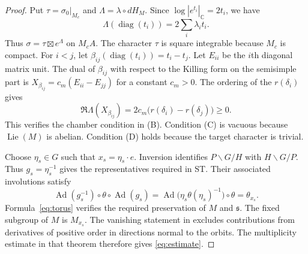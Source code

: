 \documentclass[11pt]{amsart}
\newcommand{\C}{\mathbb C}
\DeclareMathOperator{\Ad}{Ad}
\DeclareMathOperator{\diag}{diag}
\DeclareMathOperator{\Lie}{Lie}
\numberwithin{equation}{section}
\begin{document}
\begin{proof}
Put $\tau=\sigma_0|_{M_c}$ and $\Lambda=\lambda\circ dH_M$.
Since $\log|e^{t_i}|_\C=2t_i$, we have
\begin{equation}\label{eq:parameter}
 \Lambda(\diag(t_i))=2\sum_i\lambda_i t_i.
\end{equation}
Thus $\sigma=\tau\boxtimes e^\Lambda$ on $M_cA$.
The character $\tau$ is square integrable because $M_c$ is compact.
For $i<j$, let $\beta_{ij}(\diag(t_i))=t_i-t_j$.
Let $E_{ii}$ be the $i$th diagonal matrix unit.
The dual of $\beta_{ij}$ with respect to the Killing form on the
semisimple part is $X_{\beta_{ij}}=c_m(E_{ii}-E_{jj})$ for a
constant $c_m>0$.
The ordering of the $r(\delta_i)$ gives
\begin{equation}\label{eq:chamber}
 \Re\Lambda(X_{\beta_{ij}})
 =2c_m\bigl(r(\delta_i)-r(\delta_j)\bigr)\ge0.
\end{equation}
This verifies the chamber condition in (B).
Condition (C) is vacuous because $\Lie(M)$ is abelian.
Condition (D) holds because the target character is trivial.

Choose $\eta_s\in G$ such that $x_s=\eta_s\cdot e$.
Inversion identifies $P\backslash G/H$ with $H\backslash G/P$.
Thus $g_s=\eta_s^{-1}$ gives the representatives required in ST.
Their associated involutions satisfy
\[
 \Ad(g_s^{-1})\circ\theta\circ\Ad(g_s)
 =\Ad\bigl(\eta_s\theta(\eta_s)^{-1}\bigr)\circ\theta
 =\theta_{x_s}.
\]
Formula~\eqref{eq:torus} verifies the required preservation of
$M$ and $\mathfrak s$.
The fixed subgroup of $M$ is $M_{x_s}$.
The vanishing statement in \cite[Theorem~5.8]{ST} excludes
contributions from derivatives of positive order in directions
normal to the orbits.
The multiplicity estimate in that theorem therefore gives
\eqref{eq:estimate}.
\end{proof}
\end{document}
